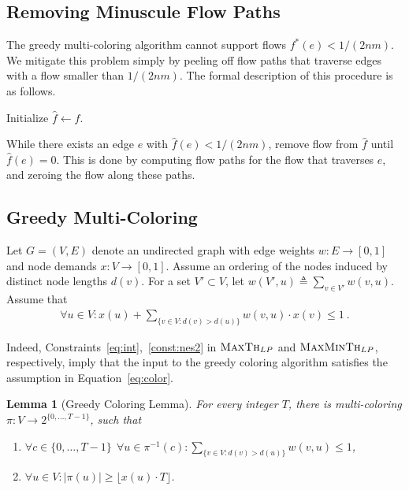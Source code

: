 \documentclass[11pt]{article}
\newenvironment{proof sketch}{\noindent {\bf Proof sketch:} }{\hfill \qed}
\newtheorem{lemma}{Lemma}
\newcommand{\eqdf}{\triangleq}
\newcommand{\LPmax}{\textsc{MaxTh}_{LP}}
\newcommand{\LPmin}{\textsc{MaxMinTh}_{LP}}
\begin{document}
\subsection{Removing Minuscule Flow Paths}\label{sec:remove}

The greedy multi-coloring algorithm cannot support flows $f^*(e) <
1/(2nm)$.  We mitigate this problem simply by peeling off flow
paths that traverse edges with a flow smaller than $1/(2nm)$.  The
formal description of this procedure is as follows.
\begin{inparaenum}[(1)]
\item Initialize $\hat{f} \gets f$.
\item While there exists an edge $e$ with $\hat{f}(e) < 1/(2nm)$,
  remove flow from $\hat{f}$ until $\hat{f}(e)=0$.  This is done by
  computing flow paths for the flow that traverses $e$, and zeroing
  the flow along these paths.
\end{inparaenum}


\subsection{Greedy Multi-Coloring}\label{sec:coloring}
Let $G=(V,E)$ denote an undirected graph with edge weights $w : E
\rightarrow [0,1]$ and node demands $x : V \rightarrow [0,1]$.  Assume
an ordering of the nodes induced by distinct node lengths $d(v)$. For a set $V'\subset
  V$, let $w(V',u)\eqdf \sum_{v\in V'} w(v,u)$.
Assume that
\begin{align}\label{eq:color}
  \forall u \in V : x(u) + \sum_{\{v \in V : d(v) > d(u)\}}w(v,u)\cdot
  x(v) \leq 1\:.
\end{align}

Indeed, Constraints~\ref{eq:int},~\ref{const:nes2} in $\LPmax$ and $\LPmin$,  respectively, imply that the input to the greedy coloring algorithm satisfies the assumption in Equation~\ref{eq:color}.

\begin{lemma}[Greedy Coloring Lemma] \label{lemma:color}
For every integer $T$, there is
  multi-coloring $\pi : V \rightarrow 2^{\{0,\ldots,T-1\}}$, such that
  \begin{enumerate}
  \item $\forall c\in \{0,\ldots,T-1\} ~~\forall u \in \pi^{-1}(c):
    \sum_{\{v \in V: d(v) > d(u)\}} w(v,u)\leq 1$, \label{item:color1}
  \item $\forall u \in V : |\pi(u)| \geq \lfloor x(u) \cdot T
    \rfloor$.
  \end{enumerate}
\end{lemma}
\end{document}
